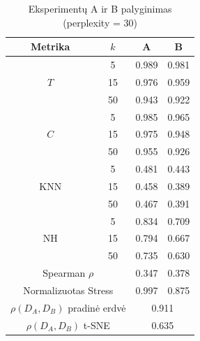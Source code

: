 \begin{table}[H]
\centering
\caption{Eksperimentų A ir B palyginimas (perplexity = \num{30})}
\label{tab:tsne_A_B}
\begin{tabular}{|c|c|c|c|}
\hline
Metrika & $k$ & A & B \\
\hline
\multirow{3}{*}{$T$} & \num{5} & \num{0.989} & \num{0.981} \\
\cline{2-4}
 & \num{15} & \num{0.976} & \num{0.959} \\
\cline{2-4}
 & \num{50} & \num{0.943} & \num{0.922} \\
\hline
\multirow{3}{*}{$C$} & \num{5} & \num{0.985} & \num{0.965} \\
\cline{2-4}
 & \num{15} & \num{0.975} & \num{0.948} \\
\cline{2-4}
 & \num{50} & \num{0.955} & \num{0.926} \\
\hline
\multirow{3}{*}{KNN} & \num{5} & \num{0.481} & \num{0.443} \\
\cline{2-4}
 & \num{15} & \num{0.458} & \num{0.389} \\
\cline{2-4}
 & \num{50} & \num{0.467} & \num{0.391} \\
\hline
\multirow{3}{*}{NH} & \num{5} & \num{0.834} & \num{0.709} \\
\cline{2-4}
 & \num{15} & \num{0.794} & \num{0.667} \\
\cline{2-4}
 & \num{50} & \num{0.735} & \num{0.630} \\
\hline
\multicolumn{2}{|c|}{Spearman $\rho$} & \num{0.347} & \num{0.378} \\
\hline
\multicolumn{2}{|c|}{Normalizuotas Stress} & \num{0.997} & \num{0.875} \\
\hline
\multicolumn{2}{|c|}{$\rho(D_{A}, D_{B})$ pradinė erdvė} & \multicolumn{2}{c|}{\num{0.911}} \\
\hline
\multicolumn{2}{|c|}{$\rho(D_{A}, D_{B})$ t-SNE} & \multicolumn{2}{c|}{\num{0.635}} \\
\hline
\end{tabular}
\end{table}

